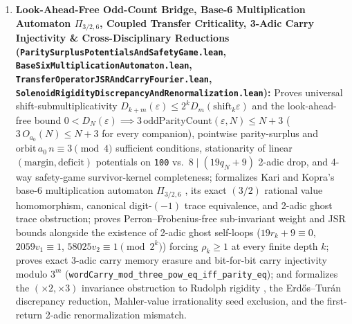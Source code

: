 \documentclass[11pt]{article}
\begin{document}
\begin{enumerate}
\texttt{dense\_core\_two\_window\_sliding\_block\_match\_coupled\_reduced\_syzygy}, \texttt{dense\_core\_two\_window\_sliding\_block\_match\_boosted\_three\_adic\_syzygy\_and\_cutoff}, \texttt{dense\_core\_two\_window\_sliding\_block\_match\_16243286400\_super\_reduced\_syzygy}, \texttt{dense\_core\_abelian\_block\_match\_sliding\_invariance\_and\_pigeonhole}, \texttt{dense\_core\_abelian\_block\_match\_16243286400\_syzygy\_and\_automatic\_28\_step\_zero\_defect}, \texttt{dense\_core\_four\_window\_abelian\_block\_carry\_cancellation\_and\_pure\_three\_adic\_sliding\_bound}, \texttt{dense\_core\_two\_wave\_abelian\_sum\_match\_automatic\_zero\_defect\_and\_sextillion\_sieve}, \texttt{dense\_core\_general\_d\_wave\_explicit\_minimum\_floor\_and\_horizon\_cutoff}, \texttt{dense\_core\_horizon\_free\_d\_gt\_N\_start\_state\_sliding\_cutoff}, \texttt{dense\_core\_horizon\_free\_d\_gt\_N\_four\_window\_abelian\_start\_state\_cutoff}, \texttt{dense\_core\_waveInteriorExp\_exact\_finset\_run\_sum\_decomposition}, \texttt{dense\_core\_no\_repeat\_permutation\_step\_sum\_cap\_and\_boosted\_L20\_cutoff}, \texttt{mahler\_dense\_core\_complete\_reduction\_and\_sliding\_syzygy\_capstone}).
  \item \textbf{Look-Ahead-Free Odd-Count Bridge, Base-6 Multiplication Automaton $\Pi_{3/2,6}$, Coupled Transfer Criticality, 3-Adic Carry Injectivity \& Cross-Disciplinary Reductions (\texttt{ParitySurplusPotentialsAndSafetyGame.lean}, \texttt{BaseSixMultiplicationAutomaton.lean}, \texttt{TransferOperatorJSRAndCarryFourier.lean}, \texttt{SolenoidRigidityDiscrepancyAndRenormalization.lean}):} Proves universal shift-submultiplicativity $D_{k+m}(\varepsilon) \le 2^k D_m(\mathrm{shift}_k\varepsilon)$ and the look-ahead-free bound $0 < D_N(\varepsilon) \implies 3\,\mathrm{oddParityCount}(\varepsilon, N) \le N + 3$ ($3\,O_{a_0}(N) \le N + 3$ for every companion), pointwise parity-surplus and $\mathrm{orbit}\,a_0\,n \equiv 3 \pmod 4$ sufficient conditions, stationarity of linear $(\text{margin}, \text{deficit})$ potentials on \texttt{100} vs.\ $8 \mid (19q_N + 9)$ 2-adic drop, and 4-way safety-game survivor-kernel completeness; formalizes Kari and Kopra's base-6 multiplication automaton $\Pi_{3/2,6}$ \cite{Kar12,Kop20}, its exact $(3/2)$ rational value homomorphism, canonical digit-$(-1)$ trace equivalence, and 2-adic ghost trace obstruction; proves Perron--Frobenius-free sub-invariant weight and JSR bounds alongside the existence of 2-adic ghost self-loops ($19r_k+9 \equiv 0$, $2059v_1 \equiv 1$, $58025v_2 \equiv 1 \pmod{2^k}$) forcing $\rho_k \ge 1$ at every finite depth $k$; proves exact 3-adic carry memory erasure and bit-for-bit carry injectivity modulo $3^m$ (\texttt{wordCarry\_mod\_three\_pow\_eq\_iff\_parity\_eq}); and formalizes the $(\times 2, \times 3)$ invariance obstruction to Rudolph rigidity \cite{Rud90}, the Erd\H{o}s--Tur\'an discrepancy reduction, Mahler-value irrationality seed exclusion, and the first-return 2-adic renormalization mismatch.

\end{enumerate}
\end{document}
